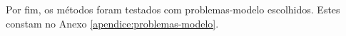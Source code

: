 Por fim, os métodos foram testados com problemas-modelo escolhidos. Estes constam no Anexo \ref{apendice:problemas-modelo}.




